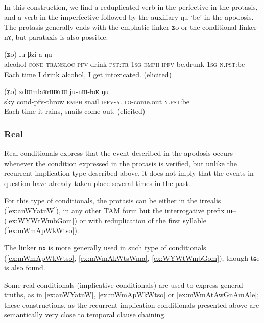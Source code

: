 \documentclass[oldfontcommands,oneside,a4paper,11pt]{article}
\newcommand{\ipa}[1]{{\phon \mbox{#1}}} %
\begin{document}
In this construction, we find a reduplicated verb in the perfective  in the protasis, and a verb in the imperfective followed by the auxiliary \ipa{ŋu} `be'   in the apodosis. The protasis generally ends with the emphatic linker \ipa{ʑo} or the conditional linker \ipa{nɤ}, but parataxis is also possible.

     \begin{exe}
   \ex \label{ex:CWCkAtshita}
   \gll
[\ipa{cha}   	\textbf{\ipa{ɕɯ-ɕ-kɤ-tsʰi-t-a}}]   	(\ipa{ʑo})   	\ipa{lu-βzi-a}   	\ipa{ŋu}   \\
alcohol \textsc{cond-transloc-pfv}-drink-\textsc{pst:tr-1sg} \textsc{emph} \textsc{ipfv}-be.drunk-\textsc{1sg} \textsc{n.pst}:be\\
\glt Each time I drink alcohol, I get intoxicated. (elicited)
\end{exe}

     \begin{exe}
   \ex \label{ex:tWmW.kWkAlAt}
   \gll
[\ipa{tɯmɯ}   \textbf{	\ipa{kɯ-kɤ-lɤt}}]   	(\ipa{ʑo})   	\ipa{zdɯmlaʁrɯʁrɯ}   	\ipa{ju-nɯ-ɬoʁ}   	\ipa{ŋu}   \\
sky {cond-pfv}-throw \textsc{emph} snail \textsc{ipfv-auto}-come.out \textsc{n.pst}:be\\
\glt Each time it rains,  snails come out. (elicited)
\end{exe}

\subsubsection{Real} \label{sec:real.conditional}
Real conditionals express that the event described in the apodosis occurs whenever the condition expressed in the protasis is verified, but unlike the recurrent implication type described above, it does not imply that the events in question have already taken place several times in the past.

For this type of conditionals, the protasis can be either in the irrealis (\ref{ex:anWYatnW}), in any other TAM form but the interrogative prefix \ipa{ɯ}-- (\ref{ex:WYWtWmbGom}) or with reduplication of the first syllable (\ref{ex:mWmApWkWtso}). 


The linker \ipa{nɤ} is more generally used in such type of conditionals (\ref{ex:mWmApWkWtso}, \ref{ex:mWmAkWtsWma}, \ref{ex:WYWtWmbGom}), though \ipa{tɕe} is also found.


Some  real conditionals (implicative conditionals) are used to express general truths, as in \ref{ex:anWYatnW}, \ref{ex:mWmApWkWtso} or \ref{ex:mWmAtAwGnAmAle}; these constructions, as the recurrent implication conditionals presented above are semantically very close to temporal clause chaining. 
\end{document}

